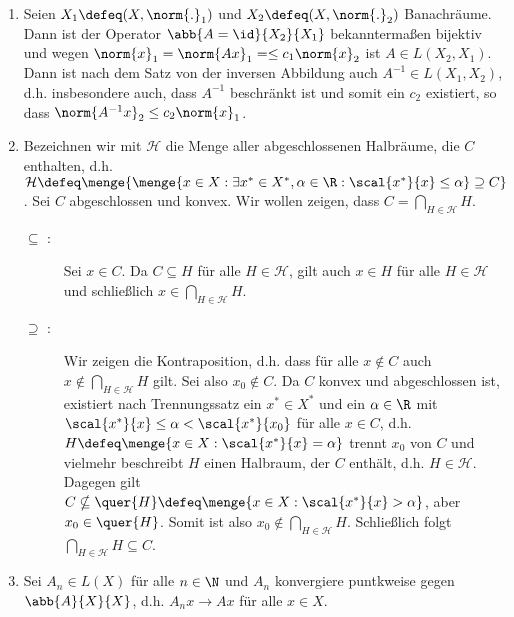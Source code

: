 \begin{exercisePage}
\begin{enumerate}[label=(zu \alph*), leftmargin=*]
 		\item Seien $X_1 \defeq (X, \norm{.}_1)$ und $X_2 \defeq (X, \norm{.}_2)$ Banachräume. Dann ist der Operator $\abb{A = \id}{X_2}{X_1}$ bekanntermaßen bijektiv und wegen $\norm{x}_1 = \norm{Ax}_1 = \le c_1 \norm{x}_2$ ist $A \in L(X_2,X_1)$. Dann ist nach dem Satz von der inversen Abbildung auch $A^{-1}\in L(X_1, X_2)$, d.h. insbesondere auch, dass $A^{-1}$ beschränkt ist und somit ein $c_2$ existiert, so dass $\norm{A^{-1}x}_2 \le c_2 \norm{x}_1$. 
 		\item Bezeichnen wir mit $\mathcal{H}$ die Menge aller abgeschlossenen Halbräume, die $C$ enthalten, d.h. $\mathcal{H} \defeq \menge{ \menge{x \in X : \exists x^\ast \in X^\ast, \alpha \in \R : \scal{x^\ast}{x} \le \alpha} \supseteq C}$. Sei $C$ abgeschlossen und konvex. Wir wollen zeigen, dass $C = \bigcap_{H \in \mathcal{H}} H$.
 		\begin{description}
 			\item[$\mathbf{\subseteq}$ :] Sei $x \in C$. Da $C \subseteq H$ für alle $H \in \mathcal{H}$, gilt auch $x \in H$ für alle $H \in \mathcal{H}$ und schließlich $x \in \bigcap_{H \in \mathcal{H}} H$.
 			\item[$\mathbf{\supseteq}$ :] Wir zeigen die Kontraposition, d.h. dass für alle $x \notin C$ auch $x \notin \bigcap_{H \in \mathcal{H}} H$ gilt. Sei also $x_0 \notin C$. Da $C$ konvex und abgeschlossen ist, existiert nach Trennungssatz ein $x^\ast \in X^\ast$ und ein $\alpha \in \R$ mit $\scal{x^\ast}{x} \le \alpha < \scal{x^\ast}{x_0}$ für alle $x \in C$, d.h. $H \defeq \menge{x \in X : \scal{x^\ast}{x} = \alpha}$ trennt $x_0$ von $C$ und vielmehr beschreibt $H$ einen Halbraum, der $C$ enthält, d.h. $H \in \mathcal{H}$. Dagegen gilt $C \nsubseteq \quer{H} \defeq \menge{x \in X : \scal{x^\ast}{x} > \alpha}$, aber $x_0 \in \quer{H}$. Somit ist also $x_0 \notin \bigcap_{H \in \mathcal{H}} H$. Schließlich folgt $\bigcap_{H \in \mathcal{H}} H \subseteq C$.
 		\end{description}
 		\item Sei $A_n \in L(X)$ für alle $n \in \N$ und $A_n$ konvergiere puntkweise gegen $\abb{A}{X}{X}$, d.h. $A_n x \to A x$ für alle $x \in X$.
 		

\end{enumerate}
\end{exercisePage}
